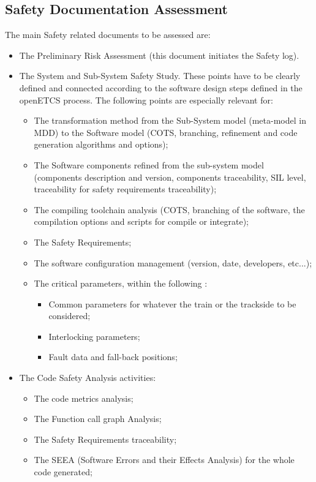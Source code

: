 \documentclass{template/openetcs_article}
\begin{document}
\subsection{Safety Documentation Assessment}
The main Safety related documents to be assessed are:
\begin{itemize}
\item The Preliminary Risk Assessment (this document initiates the Safety log).
\item The System and Sub-System Safety Study. These points have to be clearly defined and connected according to the software design steps defined in the openETCS process. The following points are especially relevant for:
	\begin{itemize}
\item The transformation method from the Sub-System model (meta-model in MDD) to the Software model (COTS, branching, refinement and code generation algorithms
and options);
\item The Software components refined from the sub-system model (components description and version, components traceability, SIL level, traceability for safety
requirements traceability);
	\item The compiling toolchain analysis (COTS, branching of the software, the compilation options and scripts for compile or integrate);
	\item The Safety Requirements;
	\item The software configuration management (version, date, developers, etc...);
	\item The critical parameters, within the following :
		\begin{itemize}
		\item Common parameters for whatever the train or the trackside to be considered;
		\item Interlocking parameters;
		\item Fault data and fall-back positions;
		\end{itemize}
	\end{itemize}
\item The Code Safety Analysis activities:
	\begin{itemize}
	\item The code metrics analysis;
	\item The Function call graph Analysis;
	\item The Safety Requirements traceability;
	\item The SEEA (Software Errors and their Effects Analysis) for the whole code generated;

\end{itemize}
\end{itemize}
\end{document}
